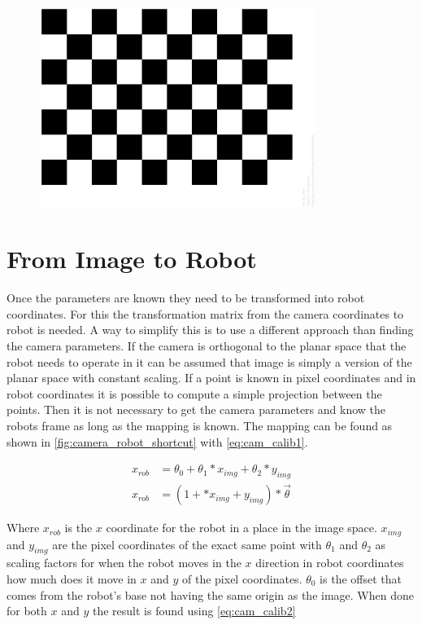 \begin{figure}[h]
\centering
\includegraphics[width=0.8\textwidth]{figures/checkerbord_pattern.png}
\caption{}
\label{fig:checkerbord_pattern}
\end{figure}


\section{From Image to Robot}
Once the parameters are known they need to be transformed into robot coordinates. For this the transformation matrix from the camera coordinates to robot is needed. A way to simplify this is to use a different approach than finding the camera parameters. If the camera is orthogonal to the planar space that the robot needs to operate in it can be assumed that image is simply a version of the planar space with constant scaling. If a point is known in pixel coordinates and in robot coordinates it is possible to compute a simple projection between the points. Then it is not necessary to get the camera parameters and know the robots frame as long as the mapping is known. The mapping can be found as shown in \autoref{fig:camera_robot_shortcut} with \autoref{eq:cam_calib1}.

\begin{equation}\label{eq:cam_calib1}
\begin{split}
x_{rob}&=\theta_{0}+\theta_{1}*x_{img}+\theta_{2}*y_{img}\\
x_{rob}&=(1+*x_{img}+y_{img}) * \vec{\theta}
\end{split}
\end{equation}

Where $x_{rob}$ is the $ x $ coordinate for the robot in a place in the image space. $x_{img}$ and $y_{img}$ are the pixel coordinates of the exact same point with $\theta_1$ and $\theta_2$ as scaling factors for when the robot moves in the $ x $ direction in robot coordinates how much does it move in $ x $ and $ y $ of the pixel coordinates. $\theta_0$ is the offset that comes from the robot's base not having the same origin as the image. When done for both $ x $ and $ y $ the result is found using \autoref{eq:cam_calib2}
 
